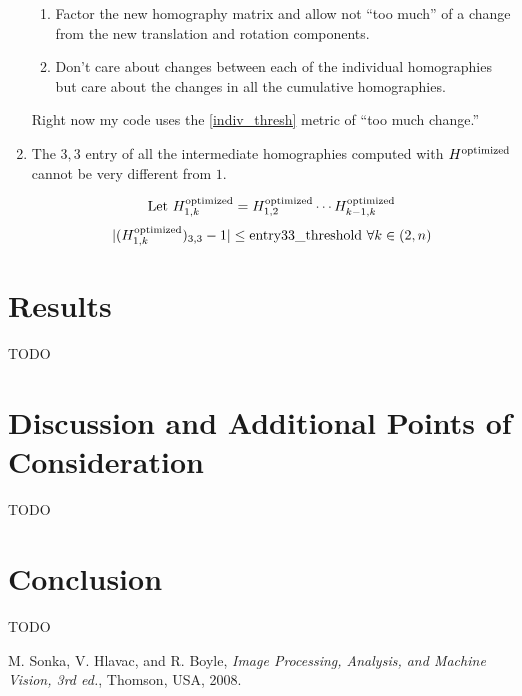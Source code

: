 \documentclass{article}
\begin{document}
\begin{enumerate}
\begin{enumerate}
\item Factor the new homography matrix and allow not ``too much'' of a change
from the new translation and rotation components.   

\item Don't care about changes between each of the individual homographies but
care about the changes in all the cumulative homographies. 

\end{enumerate} 

Right now my code uses the \ref{indiv_thresh} metric of ``too much change.''

\item The $3, 3$ entry of all the intermediate homographies computed with
$H^{\textnormal{optimized}}$ cannot be very different from $1$.

\[\textnormal{Let } H_{1, k}^{\textnormal{optimized}} = H_{1, 2}^{\textnormal{optimized}} \cdots H_{k - 1, k}^{\textnormal{optimized}}\]
\[|(H_{1, k}^{\textnormal{optimized}})_{3, 3} - 1| \leq \textnormal{entry33\_threshold } \forall k \in (2, n)\]

\end{enumerate}

\section{Results}

TODO

\section{Discussion and Additional Points of Consideration}

TODO

\section{Conclusion}

TODO

\begin{thebibliography}{1}

 M. Sonka, V. Hlavac, and R. Boyle, \emph{Image Processing, Analysis, and Machine Vision, 3rd ed.}, Thomson, USA, 2008.

\end{thebibliography}
\end{document}
